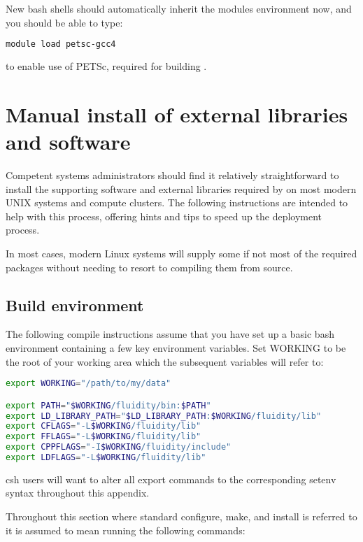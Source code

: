 New bash shells should automatically inherit the modules environment now, and
you should be able to type:

\begin{lstlisting}[language=bash]
module load petsc-gcc4
\end{lstlisting}

to enable use of PETSc, required for building \fluidity.
 
\section{Manual install of external libraries and software}
\label{sec:required_ḻibraries_manual_install}

Competent systems administrators should find it relatively straightforward to
install the supporting software and external libraries required by \fluidity on
most modern UNIX systems and compute clusters. The following instructions are
intended to help with this process, offering hints and tips to speed up the
deployment process.

In most cases, modern Linux systems will supply some if not most of the
required packages without needing to resort to compiling them from source.

\subsection{Build environment}
\label{sec:required_libraries_build_environment}

The following compile instructions assume that you have set up a basic bash
environment containing a few key environment variables. Set WORKING to be the
root of your working area which the subsequent variables will refer to:

\begin{lstlisting}[language=bash]
export WORKING="/path/to/my/data"

export PATH="$WORKING/fluidity/bin:$PATH"
export LD_LIBRARY_PATH="$LD_LIBRARY_PATH:$WORKING/fluidity/lib"
export CFLAGS="-L$WORKING/fluidity/lib"
export FFLAGS="-L$WORKING/fluidity/lib"
export CPPFLAGS="-I$WORKING/fluidity/include"
export LDFLAGS="-L$WORKING/fluidity/lib"
\end{lstlisting}

csh users will want to alter all export commands to the corresponding setenv
syntax throughout this appendix.

Throughout this section where standard configure, make, and install is referred
to it is assumed to mean running the following commands:

